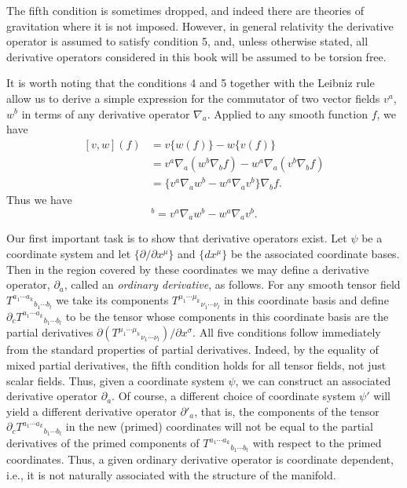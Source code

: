 The fifth condition is sometimes dropped, and indeed there are theories of gravitation where it is not imposed. However, in general relativity the derivative operator
is assumed to satisfy condition 5, and, unless otherwise stated, all derivative operators considered in this book will be assumed to be torsion free.

It is worth noting that the conditions 4 and 5 together with the Leibniz rule allow
us to derive a simple expression for the commutator of two vector fields $v^a$, $w^b$ in
terms of any derivative operator $\nabla_a$. Applied to any smooth function $f$, we have
\begin{equation}
  \begin{aligned}
    [v,w](f)
    &=v\{w(f)\}-w\{v(f)\}\\
    &=v^a\nabla_a(w^b\nabla_bf)-w^a\nabla_a(v^b\nabla_bf)\\
    &=\bigl\{v^a\nabla_aw^b-w^a\nabla_av^b\bigr\}\nabla_bf.
  \end{aligned}
  \tag{3.1.1}\label{eq:3.1.1}
\end{equation}
Thus we have
\begin{equation}
  [v,w]^b=v^a\nabla_aw^b-w^a\nabla_av^b.
  \tag{3.1.2}\label{eq:3.1.2}
\end{equation}

Our first important task is to show that derivative operators exist. Let $\psi$ be a
coordinate system and let $\{\partial/\partial x^\mu\}$ and $\{dx^\mu\}$ be the associated coordinate
bases. Then in the region covered by these coordinates we may define a derivative operator,
$\partial_a$, called an \emph{ordinary derivative}, as follows. For any smooth tensor field
$T^{a_1\cdots a_k}{}_{b_1\cdots b_l}$ we take its components
$T^{\mu_1\cdots\mu_k}{}_{\nu_1\cdots\nu_l}$ in this coordinate basis and define
$\partial_cT^{a_1\cdots a_k}{}_{b_1\cdots b_l}$ to be the tensor whose components in this coordinate basis are the
partial derivatives $\partial(T^{\mu_1\cdots\mu_k}{}_{\nu_1\cdots\nu_l})/\partial x^\sigma$. All five conditions follow immediately from
the standard properties of partial derivatives. Indeed, by the equality of mixed partial
derivatives, the fifth condition holds for all tensor fields, not just scalar fields. Thus,
given a coordinate system $\psi$, we can construct an associated derivative operator $\partial_a$.
Of course, a different choice of coordinate system $\psi'$ will yield a different derivative
operator $\partial'_a$, that is, the components of the tensor
$\partial_cT^{a_1\cdots a_k}{}_{b_1\cdots b_l}$ in the new (primed)
coordinates will not be equal to the partial derivatives of the primed components of
$T^{a_1\cdots a_k}{}_{b_1\cdots b_l}$ with respect to the primed coordinates. Thus, a given ordinary derivative
operator is coordinate dependent, i.e., it is not naturally associated with the structure
of the manifold.

